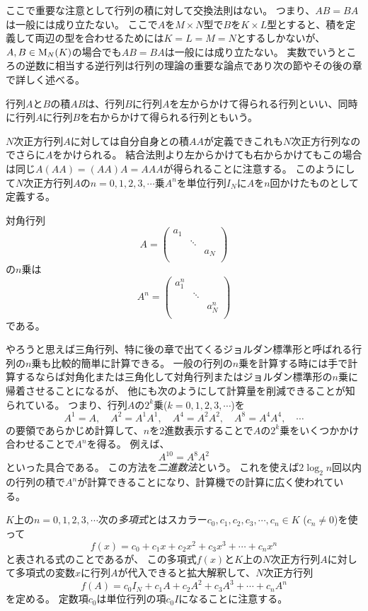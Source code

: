 ここで重要な注意として行列の積に対して交換法則はない。
つまり、$A B = B A$は一般には成り立たない。
ここで$A$を$M\times N$型で$B$を$K\times L$型とすると、積を定義して両辺の型を合わせるためには$K = L = M = N$とするしかないが、$A, B \in \mathrm{M}_N(K)$の場合でも$A B = B A$は一般には成り立たない。
実数でいうところの逆数に相当する逆行列は行列の理論の重要な論点であり次の節やその後の章で詳しく述べる。

行列$A$と$B$の積$A B$は、行列$B$に行列$A$を左からかけて得られる行列といい、同時に行列$A$に行列$B$を右からかけて得られる行列ともいう。

$N$次正方行列$A$に対しては自分自身との積$A A$が定義できこれも$N$次正方行列なのでさらに$A$をかけられる。
結合法則より左からかけても右からかけてもこの場合は同じ$A(A A) = (A A)A = A A A$が得られることに注意する。
このようにして$N$次正方行列$A$の$n = 0, 1, 2, 3, \cdots$乗$A^n$を単位行列$I_N$に$A$を$n$回かけたものとして定義する。

\begin{example}
対角行列
$$
A =
\begin{pmatrix}
a_1 &        &    \\
    & \ddots &    \\
    &        & a_N\\
\end{pmatrix}
$$
の$n$乗は
$$
A^n =
\begin{pmatrix}
a_1^n &        &    \\
    & \ddots &    \\
    &        & a_N^n\\
\end{pmatrix}
$$
である。
\end{example}

やろうと思えば三角行列、特に後の章で出てくるジョルダン標準形と呼ばれる行列の$n$乗も比較的簡単に計算できる。
一般の行列の$n$乗を計算する時には手で計算するならば対角化または三角化して対角行列またはジョルダン標準形の$n$乗に帰着させることになるが、
他にも次のようにして計算量を削減できることが知られている。
つまり、行列$A$の$2^k$乗($k = 0, 1, 2, 3, \cdots$)を
$$
A^1 = A,
\quad A^2 = A^1 A^1,
\quad A^4 = A^2 A^2,
\quad A^8 = A^4 A^4,
\quad \cdots
$$
の要領であらかじめ計算して、$n$を$2$進数表示することで$A$の$2^k$乗をいくつかかけ合わせることで$A^n$を得る。
例えば、
$$
A^10 = A^8 A^2
$$
といった具合である。
この方法を\emph{二進数法}という。
これを使えば$2\log_2 n$回以内の行列の積で$A^n$が計算できることになり、計算機での計算に広く使われている。

$K$上の$n = 0, 1, 2, 3, \cdots$次の\emph{多項式}とはスカラー$c_0, c_1, c_2, c_3, \cdots, c_n \in K$ ($c_n \ne 0$)を使って
$$
f(x) = c_0+c_1 x+c_2 x^2+c_3 x^3+\cdots+c_n x^n
$$
と表される式のことであるが、
この多項式$f(x)$と$K$上の$N$次正方行列$A$に対して多項式の変数$x$に行列$A$が代入できると拡大解釈して、$N$次正方行列
$$
f(A) = c_0 I_N+c_1 A+c_2 A^2+c_3 A^3+\cdots+c_n A^n
$$
を定める。
定数項$c_0$は単位行列の項$c_0 I$になることに注意する。

